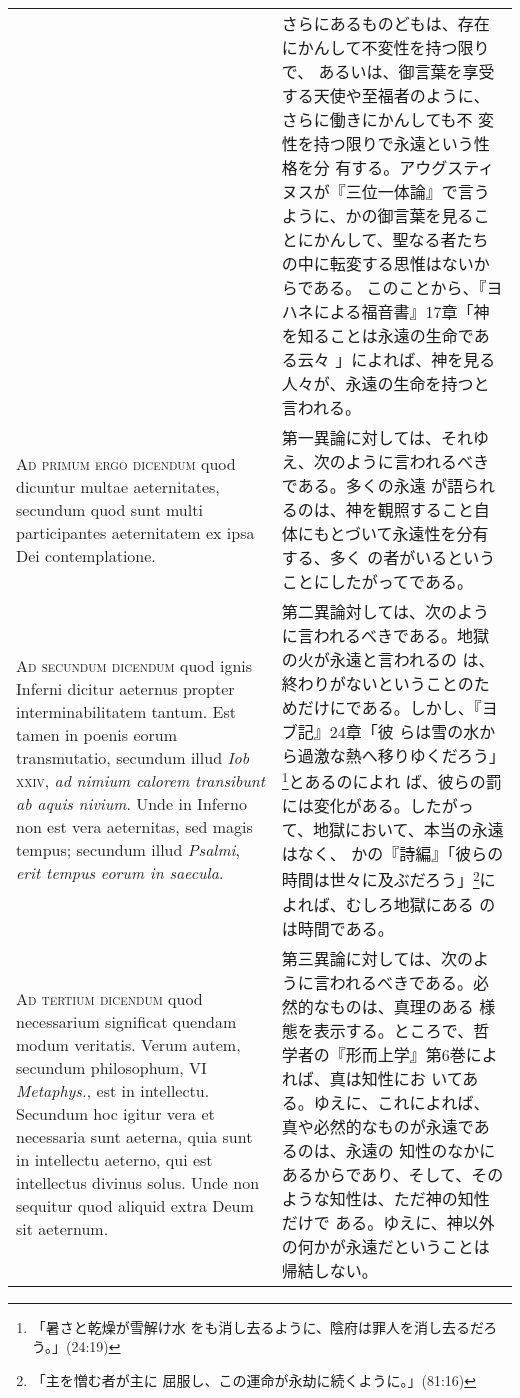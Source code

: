\documentclass[10pt]{jsarticle} %
\begin{document}
\begin{longtable}{p{21em}p{21em}}
&


さらにあるものどもは、存在にかんして不変性を持つ限りで、
あるいは、御言葉を享受する天使や至福者のように、さらに働きにかんしても不
変性を持つ限りで永遠という性格を分
有する。アウグスティヌスが『三位一体論』で言うように、かの御言葉を見るこ
とにかんして、聖なる者たちの中に転変する思惟はないからである。
このことから、『ヨハネによる福音書』17章「神を知ることは永遠の生命である云々
」によれば、神を見る人々が、永遠の生命を持つと言われる。

\\


{\scshape Ad primum ergo dicendum} quod dicuntur multae aeternitates,
secundum quod sunt multi participantes aeternitatem ex ipsa Dei
contemplatione.

&

第一異論に対しては、それゆえ、次のように言われるべきである。多くの永遠
が語られるのは、神を観照すること自体にもとづいて永遠性を分有する、多く
の者がいるということにしたがってである。

\\

{\scshape Ad secundum dicendum} quod ignis Inferni dicitur aeternus
propter interminabilitatem tantum. Est tamen in poenis eorum
transmutatio, secundum illud {\it Iob} {\scshape xxiv}, {\itshape ad nimium
calorem transibunt ab aquis nivium}. Unde in Inferno non est vera
aeternitas, sed magis tempus; secundum illud {\it Psalmi}, {\itshape erit tempus
eorum in saecula}.

&

第二異論対しては、次のように言われるべきである。地獄の火が永遠と言われるの
は、終わりがないということのためだけにである。しかし、『ヨブ記』24章「彼
らは雪の水から過激な熱へ移りゆくだろう」\footnote{「暑さと乾燥が雪解け水
をも消し去るように、陰府は罪人を消し去るだろう。」(24:19)}とあるのによれ
ば、彼らの罰には変化がある。したがって、地獄において、本当の永遠はなく、
かの『詩編』「彼らの時間は世々に及ぶだろう」\footnote{「主を憎む者が主に
屈服し、この運命が永劫に続くように。」(81:16)}によれば、むしろ地獄にある
のは時間である。

\\

{\scshape Ad tertium dicendum} quod necessarium significat quendam modum
veritatis. Verum autem, secundum philosophum, VI {\it Metaphys.}, est in
intellectu. Secundum hoc igitur vera et necessaria sunt aeterna, quia
sunt in intellectu aeterno, qui est intellectus divinus solus. Unde non
sequitur quod aliquid extra Deum sit aeternum.

&

第三異論に対しては、次のように言われるべきである。必然的なものは、真理のある
様態を表示する。ところで、哲学者の『形而上学』第6巻によれば、真は知性にお
いてある。ゆえに、これによれば、真や必然的なものが永遠であるのは、永遠の
知性のなかにあるからであり、そして、そのような知性は、ただ神の知性だけで
ある。ゆえに、神以外の何かが永遠だということは帰結しない。


\end{longtable}
\end{document}
